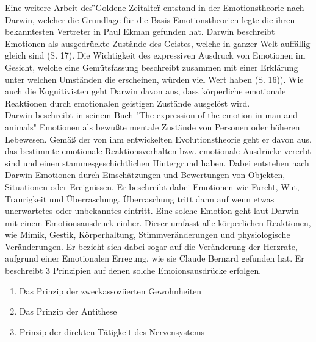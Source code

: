 Eine weitere Arbeit des \"{}Goldene Zeitalter\"{} entstand in der Emotionstheorie nach Darwin, welcher die Grundlage für die Basis-Emotionstheorien legte die ihren bekanntesten Vertreter in Paul Ekman gefunden hat. Darwin \cite{darwin_et_al} beschreibt Emotionen als ausgedrückte Zustände des Geistes, welche in ganzer Welt auffällig gleich sind (S. 17). Die Wichtigkeit des expressiven Ausdruck von Emotionen im Gesicht, welche eine Gemütsfassung beschreibt zusammen mit einer Erklärung unter welchen Umständen die erscheinen, würden viel Wert haben (S. 16)). Wie auch die Kognitivisten geht Darwin davon aus, dass körperliche emotionale Reaktionen durch emotionalen geistigen Zustände ausgelöst wird.\\
Darwin beschreibt in seinem Buch "The expression of the emotion in man and animals" Emotionen als bewußte mentale Zustände von Personen oder höheren Lebewesen. Gemäß der von ihm entwickelten Evolutionstheorie geht er davon aus, das bestimmte emotionale Reaktionsverhalten bzw. emotionale Ausdrücke vererbt sind und einen stammesgeschichtlichen Hintergrund haben. Dabei entstehen nach Darwin Emotionen  durch Einschätzungen und Bewertungen von Objekten, Situationen oder Ereignissen. Er beschreibt dabei Emotionen wie Furcht, Wut, Traurigkeit und Überraschung. Überraschung tritt dann auf wenn etwas unerwartetes oder unbekanntes eintritt. Eine solche Emotion geht laut Darwin mit einem Emotionsausdruck einher. Dieser umfasst alle körperlichen Reaktionen, wie Mimik, Gestik, Körperhaltung, Stimmveränderungen und physiologische Veränderungen. Er bezieht sich dabei sogar auf die Veränderung der Herzrate, aufgrund einer Emotionalen Erregung, wie sie Claude Bernard gefunden hat. Er beschreibt 3 Prinzipien auf denen solche Emoionsausdrücke erfolgen.
\begin{enumerate}
\item Das Prinzip der zweckassoziierten Gewohnheiten
\item Das Prinzip der Antithese
\item Prinzip der direkten Tätigkeit des Nervensystems
\end{enumerate}
